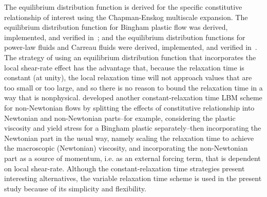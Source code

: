 \documentclass{article}
\begin{document}
The equilibrium distribution function is derived for the specific constitutive relationship of interest using the Chapman-Enskog multiscale expansion.
The equilibrium distribution function for Bingham plastic flow was derived, implemented, and verified in~\cite{wang2008lattice}; and the equilibrium distribution functions for power-law fluids and Carreau fluids were derived, implemented, and verified in~\cite{yoshino2007numerical}.
The strategy of using an equilibrium distribution function that incorporates the local shear-rate effect has the advantage that, because the relaxation time is constant (at unity), the local relaxation time will not approach values that are too small or too large, and so there is no reason to bound the relaxation time in a way that is nonphysical.
\citet{wang2011lattice} developed another constant-relaxation time LBM scheme for non-Newtonian flows by splitting the effects of constitutive relationship into Newtonian and non-Newtonian parts--for example, considering the plastic viscosity and yield stress for a Bingham plastic separately--then incorporating the Newtonian part in the usual way, namely scaling the relaxation time to achieve the macroscopic (Newtonian) viscosity, and incorporating the non-Newtonian part as a source of momentum, i.e. as an external forcing term, that is dependent on local shear-rate.
Although the constant-relaxation time strategies present interesting alternatives, the variable relaxation time scheme is used in the present study because of its simplicity and flexibility. %
\end{document}
